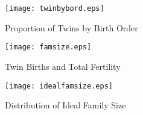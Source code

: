 \begin{figure}[h!]
\begin{center}
\caption{Proportion of Twins by Birth Order}
\texttt{[image: twinbybord.eps]} 
\label{fig:twinbybord}
\end{center}
\end{figure}


\begin{figure}[h!]
\begin{center}
\caption{Twin Births and Total Fertility}
\texttt{[image: famsize.eps]} 
\label{fig:famsize}
\end{center}
\end{figure}


\begin{figure}[h!]
\begin{center}
\caption{Distribution of Ideal Family Size}
\texttt{[image: idealfamsize.eps]} 
\label{fig:ideal}
\end{center}
\end{figure}

